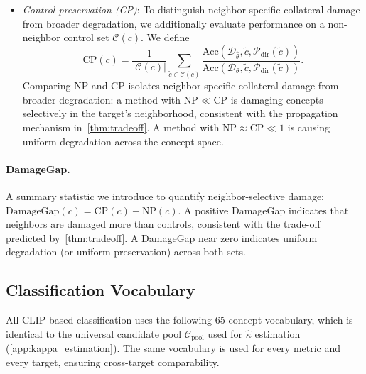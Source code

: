 \begin{itemize}
    \item \emph{Control preservation (CP)}: To distinguish neighbor-specific collateral damage from broader degradation, we additionally evaluate performance on a non-neighbor control set $\mathcal{C}(c)$. We define
    \begin{equation}
    \label{eq:cp}
    \mathrm{CP}(c) = \frac{1}{|\mathcal{C}(c)|} \sum_{\tilde c \in \mathcal{C}(c)} 
    \frac{\mathrm{Acc}(\mathcal{D}_{\hat\theta}, \tilde c, \mathcal{P}_{\mathrm{dir}}(\tilde c))}
     {\mathrm{Acc}(\mathcal{D}_\theta, \tilde c, \mathcal{P}_{\mathrm{dir}}(\tilde c))}.
    \end{equation}
    Comparing NP and CP isolates neighbor-specific collateral damage from broader degradation: a method with $\mathrm{NP} \ll \mathrm{CP}$ is damaging concepts selectively in the target's neighborhood, consistent with the propagation mechanism in~\cref{thm:tradeoff}. A method with $\mathrm{NP} \approx \mathrm{CP} \ll 1$ is causing uniform degradation across the concept space.
\end{itemize}




\paragraph{DamageGap.} A summary statistic we introduce to quantify neighbor-selective damage: $\mathrm{DamageGap}(c) = \mathrm{CP}(c) - \mathrm{NP}(c)$. A positive DamageGap indicates that neighbors are damaged more than controls, consistent with the trade-off predicted by~\cref{thm:tradeoff}. A DamageGap near zero indicates uniform degradation (or uniform preservation) across both sets.

\subsection{Classification Vocabulary}
\label{app:vocab}
All CLIP-based classification uses the following 65-concept vocabulary, which is identical to the universal candidate pool $\mathcal{C}_{\mathrm{pool}}$ used for $\hat\kappa$ estimation (\cref{app:kappa_estimation}).
The same vocabulary is used for every metric and every target, ensuring cross-target comparability.

